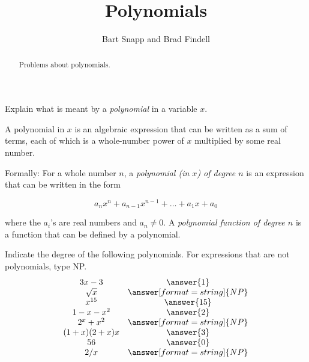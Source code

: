 \documentclass[nooutcomes]{ximera}
\title{Polynomials}
\author{Bart Snapp and Brad Findell}
\begin{document}
\begin{abstract}
Problems about polynomials.
\end{abstract}
\maketitle

\begin{problem}Explain what is meant by a \textit{polynomial} in a variable $x$.  
\begin{freeResponse}
\begin{hint}
A polynomial in $x$ is an algebraic expression that can be written as a sum of terms, each of which is a whole-number power of $x$ multiplied by some real number.  

Formally: For a whole number $n$, a \emph{polynomial (in $x$) of degree $n$} is an expression that can be written in the form 

$$a_nx^n+a_{n-1}x^{n-1}+\dots+a_1x + a_0$$

where the $a_i$'s are real numbers and $a_n\ne 0$.  
A \emph{polynomial function of degree $n$} is a function that can be defined by a polynomial.  

\end{hint}
\end{freeResponse}
\end{problem} 


\begin{problem}
Indicate the degree of the following polynomials.  For expressions that are not polynomials, type NP.
\[
\begin{array}{cc}
 3x-3 &     \answer{1} \\
 \sqrt{x} & \answer[format=string]{NP} \\
 x^{15}  & \answer{15} \\
 1-x-x^2 & \answer{2} \\
 2^x + x^2     & \answer[format=string]{NP} \\
 (1+x)(2+x)x & \answer{3} \\
 56      & \answer{0} \\
 2/x & \answer[format=string]{NP}  
\end{array}
\]
\end{problem}
\end{document}
